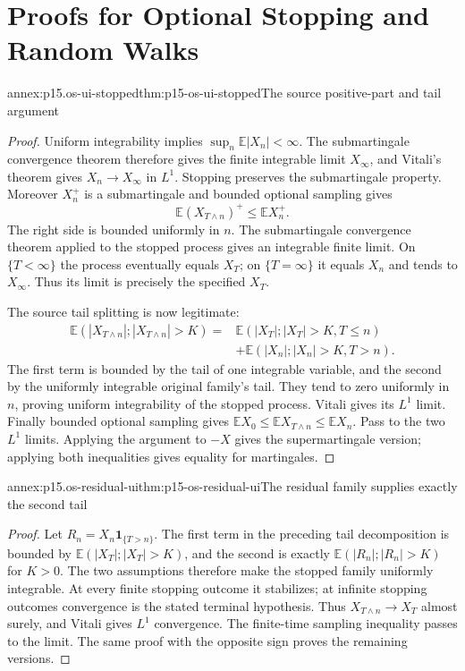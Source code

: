 \section{Proofs for Optional Stopping and Random Walks}
\label{sec:annex-p15-optional-stopping-and-random-walks}

\begin{annexitem}{annex:p15.os-ui-stopped}{thm:p15-os-ui-stopped}{The source positive-part and tail argument}
\begin{proof}
Uniform integrability implies \(\sup_n\mathbb E|X_n|<\infty\).
The submartingale convergence theorem therefore gives the finite
integrable limit \(X_\infty\), and Vitali's theorem gives
\(X_n\to X_\infty\) in \(L^1\).
Stopping preserves the submartingale property.
Moreover \(X_n^+\) is a submartingale and bounded optional
sampling gives
\[
 \mathbb E(X_{T\wedge n})^+\leq\mathbb EX_n^+.
 \]
The right side is bounded uniformly in \(n\).
The submartingale convergence theorem applied to the stopped
process gives an integrable finite limit. On \(\{T<\infty\}\)
the process eventually equals \(X_T\); on \(\{T=\infty\}\)
it equals \(X_n\) and tends to \(X_\infty\).
Thus its limit is precisely the specified \(X_T\).

The source tail splitting is now legitimate:
\[
 \begin{split}
 \mathbb E(|X_{T\wedge n}|;|X_{T\wedge n}|>K)
 ={}&\mathbb E(|X_T|;|X_T|>K,T\leq n)\\
 &+\mathbb E(|X_n|;|X_n|>K,T>n).
 \end{split}
 \]
The first term is bounded by the tail of one integrable variable,
and the second by the uniformly integrable original family's tail.
They tend to zero uniformly in \(n\), proving uniform
integrability of the stopped process. Vitali gives its \(L^1\) limit.
Finally bounded optional sampling gives
\(\mathbb EX_0\leq\mathbb EX_{T\wedge n}\leq\mathbb EX_n\).
Pass to the two \(L^1\) limits. Applying the argument to \(-X\)
gives the supermartingale version; applying both inequalities
gives equality for martingales.
\end{proof}
\end{annexitem}

\begin{annexitem}{annex:p15.os-residual-ui}{thm:p15-os-residual-ui}{The residual family supplies exactly the second tail}
\begin{proof}
Let \(R_n=X_n\mathbf1_{\{T>n\}}\).
The first term in the preceding tail decomposition is bounded
by \(\mathbb E(|X_T|;|X_T|>K)\), and the second is exactly
\(\mathbb E(|R_n|;|R_n|>K)\) for \(K>0\).
The two assumptions therefore make the stopped family uniformly
integrable. At every finite stopping outcome it stabilizes;
at infinite stopping outcomes convergence is the stated terminal
hypothesis. Thus \(X_{T\wedge n}\to X_T\) almost surely,
and Vitali gives \(L^1\) convergence.
The finite-time sampling inequality passes to the limit.
The same proof with the opposite sign proves the remaining versions.
\end{proof}
\end{annexitem}

